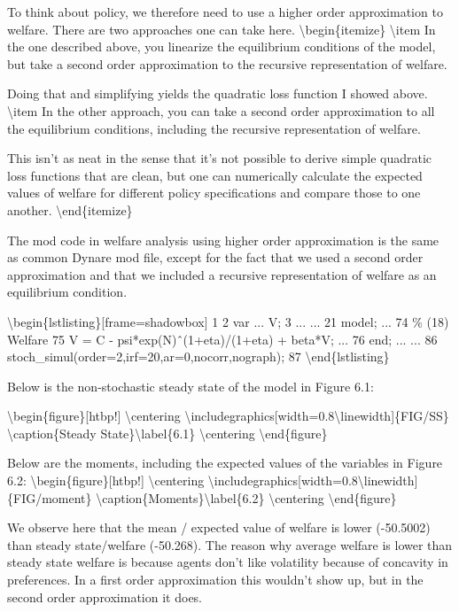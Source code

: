 \documentclass[10pt,math=newtx,citestyle=gb7714-2015,bibstyle=gb7714-2015]{elegantbook}
\begin{document}
	To think about policy, we therefore need to use a higher order approximation to welfare. There are two approaches one can take here.
	\textbackslash{}begin\{itemize\}
	\textbackslash{}item In the one described above, you linearize the equilibrium conditions of the model, but take a second order approximation to the recursive representation of welfare.
	
	Doing that and simplifying yields the quadratic loss function I showed above.
	\textbackslash{}item In the other approach, you can take a second order approximation to all the equilibrium conditions, including the recursive representation of welfare.
	
	This isn't as neat in the sense that it's not possible to derive simple quadratic loss functions that are clean, but one can numerically calculate the expected values of welfare for different policy specifications and compare those to one another.
	\textbackslash{}end\{itemize\}
	
	The mod code in welfare analysis using higher order approximation is the same as common Dynare mod file, except for the fact that we used a second order approximation and that we included a recursive representation of welfare as an equilibrium condition.
	
	\textbackslash{}begin\{lstlisting\}[frame=shadowbox]
	1 
	2 var ... V;
	3
	...
	...
	21 model;
	...
	74 \% (18) Welfare
	75 V = C - psi*exp(N)ˆ(1+eta)/(1+eta) + beta*V;
	...
	76 end;
	...
	...
	86 stoch\_simul(order=2,irf=20,ar=0,nocorr,nograph);
	87
	\textbackslash{}end\{lstlisting\}
	
	Below is the non-stochastic steady state of the model in Figure 6.1:
	
	\textbackslash{}begin\{figure\}[htbp!]
	\textbackslash{}centering
	\textbackslash{}includegraphics[width=0.8\textbackslash{}linewidth]\{FIG/SS\}
	\textbackslash{}caption\{Steady State\}\textbackslash{}label\{6.1\}
	\textbackslash{}centering
	\textbackslash{}end\{figure\}
	
	Below are the moments, including the expected values of the variables in Figure 6.2:
	\textbackslash{}begin\{figure\}[htbp!]
	\textbackslash{}centering
	\textbackslash{}includegraphics[width=0.8\textbackslash{}linewidth]\{FIG/moment\}
	\textbackslash{}caption\{Moments\}\textbackslash{}label\{6.2\}
	\textbackslash{}centering
	\textbackslash{}end\{figure\}
	
	We observe here that the mean / expected value of welfare is lower (-50.5002) than steady state/welfare (-50.268). The reason why average welfare is lower than steady state welfare is because agents don't like volatility because of concavity in preferences. In a first order approximation this wouldn't show up, but in the second order approximation it does.
	
\end{document}
